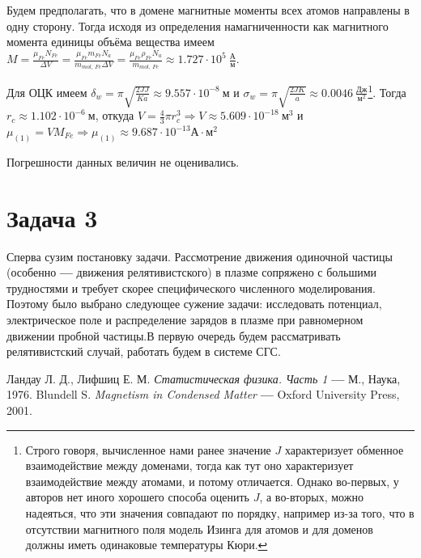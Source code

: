 \documentclass[oneside,final,14pt]{extarticle}
\begin{document}
	Будем предполагать, что в домене магнитные моменты всех атомов направлены в одну сторону. Тогда исходя из определения намагниченности как магнитного момента единицы объёма вещества имеем $M=\frac{\mu_{Fe}N_{Fe}}{\Delta V}=\frac{\mu_{Fe}m_{Fe}N_{a}}{m_{mol, \ Fe}\Delta V}=\frac{\mu_{Fe}\rho_{Fe}N_{a}}{m_{mol, \ Fe}}\approx 1.727 \cdot 10^{5} \ \frac{\text{А}}{\text{м}}$.
	
	Для ОЦК имеем $\delta_{w}=\pi \sqrt{\frac{2JJ}{Ka}}\approx 9.557\cdot 10^{-8} \ \text{м}$ и $\sigma_{w}=\pi \sqrt{\frac{2JK}{a}}\approx 0.0046 \ \frac{\text{Дж}}{\text{м}^2}$\footnote{Строго говоря, вычисленное нами ранее значение $J$ характеризует обменное взаимодействие между доменами, тогда как тут оно характеризует взаимодействие между атомами, и потому отличается. Однако во-первых, у авторов нет иного хорошего способа оценить $J$, а во-вторых, можно надеяться, что эти значения совпадают по порядку, например из-за того, что в отсутствии магнитного поля модель Изинга для атомов и для доменов должны иметь одинаковые температуры Кюри.}. Тогда $r_{c} \approx 1.102 \cdot 10^{-6} \ \text{м}$, откуда $V=\frac{4}{3}\pi r_{c}^3 \Rightarrow \boxed{V \approx 5.609 \cdot 10^{-18} \ \text{м}^3}$ и $\mu_{(1)}=VM_{Fe} \Rightarrow \boxed{\mu_{(1)}\approx 9.687 \cdot 10^{-13} \text{А}\cdot\text{м}^2}$
	
	Погрешности данных величин не оценивались.
	\newpage
	
	\section{Задача 3}
	
	Сперва сузим постановку задачи. Рассмотрение движения одиночной частицы (особенно \textbf{---} движения релятивистского) в плазме сопряжено с большими трудностями и требует скорее специфического численного моделирования. Поэтому было выбрано следующее сужение задачи: исследовать потенциал, электрическое поле и распределение зарядов в плазме при равномерном движении пробной частицы.В первую очередь будем рассматривать релятивистский случай, работать будем в системе СГС.  
	
	\newpage
	\begin{thebibliography}{0}
		 Ландау Л. Д., Лифшиц Е. М. \textit{Статистическая физика. Часть 1} \textbf{---} М., Наука, 1976.
		 Blundell S. \textit{Magnetism in Condensed Matter} \textbf{---} Oxford University Press, 2001.
	\end{thebibliography}
\end{document}
